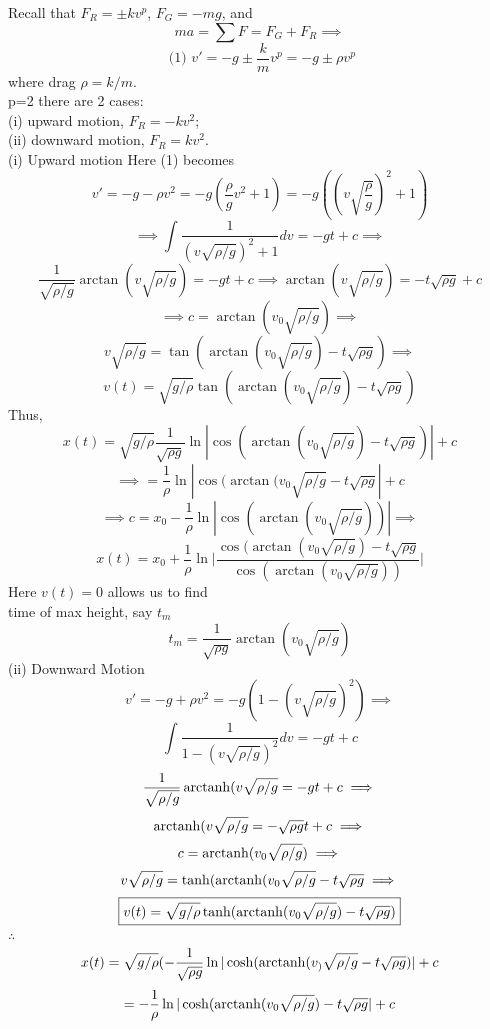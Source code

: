 
  \newpage
  Recall that \(F_R = \pm kv^p  \), \( F_G = -mg \), and 
  \[ ma = \sum F = F_G + F_R \implies \]
  \[ \text{ (1) } v' = -g \pm \frac{k}{m} v^p = -g \pm \rho v^p \]
  where drag \( \rho = k/m \).\\
  p=2 there are 2 cases: \\
  (i) upward motion, \( F_R = -kv^2 \);\\
  (ii) downward motion, \( F_R = kv^2 \).\\[5mm]
  (i) Upward motion
  Here (1) becomes 
  \[ v' = -g-\rho v^2 = -g( \frac{\rho}{g} v^2 + 1) = -g((v \sqrt{
  \frac{\rho}{g}})^2+1) \]
  \[ \implies \int \frac{1}{(v \sqrt{\rho/g})^2 + 1} dv = -gt + c \implies \]
  \[ \frac{1}{ \sqrt{\rho/g}} \arctan(v \sqrt{\rho/g}) = -gt + c \implies
  \arctan  (v \sqrt{\rho/g}) = -t \sqrt{\rho g} + c \]
  \[ \implies c = \arctan (v_0 \sqrt{\rho/g}) \implies \]
  \[ v \sqrt{\rho/g} = \tan ( \arctan (v_0\sqrt{\rho/g}) - t \sqrt{\rho g})
  \implies\]
  \[ \boxed{v(t) = \sqrt{g/ \rho} \tan ( \arctan( v_0\sqrt{\rho/g}) - t
  \sqrt{\rho g})} \]
  Thus, 
  \[ x(t) = \sqrt{g/\rho} \frac{1}{ \sqrt{\rho g}} \ln | \cos(\arctan(v_0
  \sqrt{\rho/g}) -t \sqrt{\rho g})| + c \]
  \[ \implies = \frac{1}{\rho} \ln | \cos (\arctan(v_0 \sqrt{\rho/g} - t
  \sqrt{\rho g}| +c \]
  \[\implies c = x_0 - \frac{1}{\rho} \ln | \cos ( \arctan (v_0 \sqrt{\rho/g}))|
  \implies \]
  \[ \boxed{ x(t) = x_0 + \frac{1}{\rho} \ln \bigg| \frac{\cos(\arctan(v_0
  \sqrt{\rho/g}) -t \sqrt{\rho g}}{\cos (\arctan (v_0 \sqrt{\rho/g}))}
  \bigg|}  \]
  Here \( v(t) = 0 \) allows us to find \\
  time of max height, say \( t_m \)
  \[ \boxed{ t_m = \frac{1}{ \sqrt{\rho g}} \arctan(v_0 \sqrt{\rho /g})} \]
  (ii) Downward Motion
  \[ v' = -g+\rho v^2 = -g(1 - (v \sqrt{\rho/g})^2) \implies \]
  \[ \int \frac{1}{1 - (v \sqrt{\rho/g})^2}dv = -gt + c \] %
  \[ \frac{1}{ \sqrt{\rho/g}} \operatorname{arctanh} (v \sqrt{\rho/g} = -gt + c \implies
  \] 
  \[ \operatorname{arctanh} (v \sqrt{\rho/g} = - \sqrt{\rho g} t + c \implies \]
  \[ c = \operatorname{arctanh} ( v_0 \sqrt{\rho/g} ) \implies \]
  \[ v \sqrt{\rho/g} = \tanh ( \operatorname{arctanh}(v_0 \sqrt{\rho/g} - t \sqrt{\rho g}
  \implies\]
  \[ \boxed{ v(t) = \sqrt{g/\rho} \tanh ( \operatorname{arctanh} (v_0 \sqrt{\rho/g})-t
  \sqrt{\rho g})} \]
  \( \therefore \)
  \[ x(t)= \sqrt{g/\rho}( -\frac{1}{ \sqrt{\rho g}} \ln | \cosh ( \operatorname{arctanh}
  (v_) \sqrt{\rho/g} -t \sqrt{\rho g}) | + c\]
  \[ = -\frac{1}{\rho} \ln | \cosh ( \operatorname{arctanh} (v_0 \sqrt{\rho/g}) - t
  \sqrt{\rho g}| + c \]
